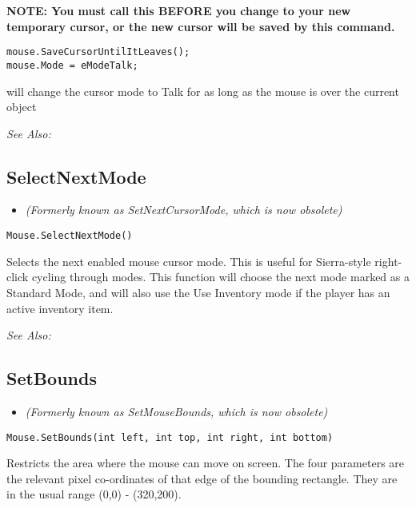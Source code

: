 \bf{NOTE:} You must call this \bf{BEFORE} you change to your new temporary cursor, or the
new cursor will be saved by this command.

\begin{verbatim}
mouse.SaveCursorUntilItLeaves();
mouse.Mode = eModeTalk;
\end{verbatim}
will change the cursor mode to Talk for as long as the mouse is over the current object

\it{See Also:} 


\subsection{SelectNextMode}\label{Mouse.SelectNextMode}%

\begin{itemize}
\item \it{(Formerly known as SetNextCursorMode, which is now obsolete)}
\end{itemize}

\begin{verbatim}
Mouse.SelectNextMode()
\end{verbatim}
Selects the next enabled mouse cursor mode. This is useful for Sierra-style right-click
cycling through modes. This function will choose the next mode marked as a Standard Mode, and
will also use the Use Inventory mode if the player has an active inventory item.

\it{See Also:} 


\subsection{SetBounds}\label{Mouse.SetBounds}%

\begin{itemize}
\item \it{(Formerly known as SetMouseBounds, which is now obsolete)}
\end{itemize}

\begin{verbatim}
Mouse.SetBounds(int left, int top, int right, int bottom)
\end{verbatim}

Restricts the area where the mouse can move on screen. The four parameters are
the relevant pixel co-ordinates of that edge of the bounding rectangle. They are
in the usual range (0,0) - (320,200).

